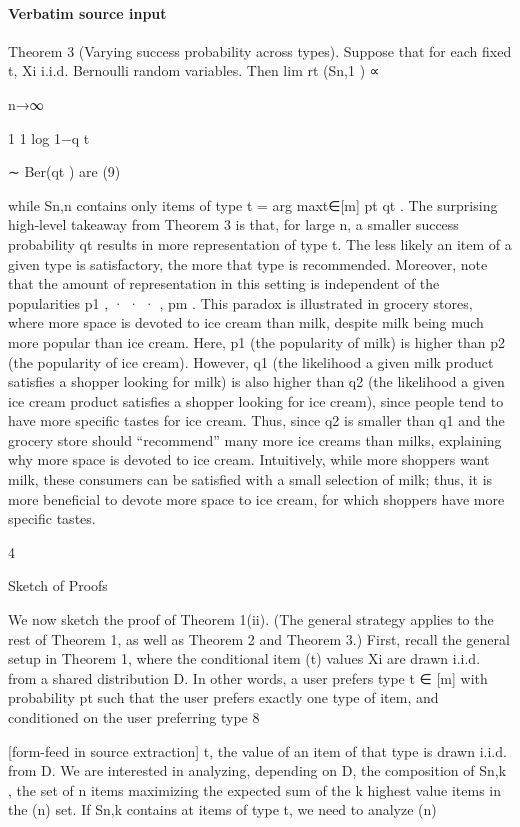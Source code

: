 \documentclass[10pt]{article}
\begin{document}
\paragraph{Verbatim source input}
\begin{ReviewVerbatim}
Theorem 3 (Varying success probability across types). Suppose that for each fixed t, Xi
i.i.d. Bernoulli random variables. Then
lim rt (Sn,1 ) ∝

n→∞

1
1
log 1−q
t

∼ Ber(qt ) are
(9)

while Sn,n contains only items of type t = arg maxt∈[m] pt qt .
The surprising high-level takeaway from Theorem 3 is that, for large n, a smaller success probability qt
results in more representation of type t. The less likely an item of a given type is satisfactory, the more that
type is recommended. Moreover, note that the amount of representation in this setting is independent of the
popularities p1 , · · · , pm .
This paradox is illustrated in grocery stores, where more space is devoted to ice cream than milk, despite
milk being much more popular than ice cream. Here, p1 (the popularity of milk) is higher than p2 (the
popularity of ice cream). However, q1 (the likelihood a given milk product satisfies a shopper looking for
milk) is also higher than q2 (the likelihood a given ice cream product satisfies a shopper looking for ice cream),
since people tend to have more specific tastes for ice cream. Thus, since q2 is smaller than q1 and the grocery
store should “recommend” many more ice creams than milks, explaining why more space is devoted to ice
cream. Intuitively, while more shoppers want milk, these consumers can be satisfied with a small selection
of milk; thus, it is more beneficial to devote more space to ice cream, for which shoppers have more specific
tastes.

4

Sketch of Proofs

We now sketch the proof of Theorem 1(ii). (The general strategy applies to the rest of Theorem 1, as well
as Theorem 2 and Theorem 3.) First, recall the general setup in Theorem 1, where the conditional item
(t)
values Xi are drawn i.i.d. from a shared distribution D. In other words, a user prefers type t ∈ [m] with
probability pt such that the user prefers exactly one type of item, and conditioned on the user preferring type
8


[form-feed in source extraction]
t, the value of an item of that type is drawn i.i.d. from D. We are interested in analyzing, depending on D,
the composition of Sn,k , the set of n items maximizing the expected sum of the k highest value items in the
(n)
set. If Sn,k contains at items of type t, we need to analyze
(n)


\end{ReviewVerbatim}
\end{document}

